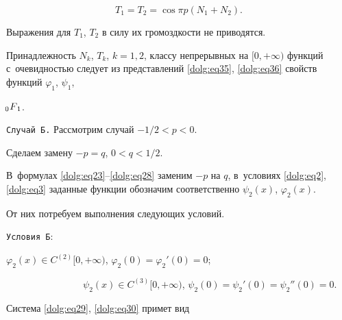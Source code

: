 \begin{equation}\label{dolg:eq38}

T_1 = T_2 = \cos\pi p (N_1+N_2).

\end{equation}

Выражения для $T_1$, $T_2$ в силу их громоздкости не приводятся.



Принадлежность $N_k$, $T_k$, $k=1, 2$, классу непрерывных на $[0,+\infty)$ функций с~очевидностью следует из представлений \eqref{dolg:eq35}, \eqref{dolg:eq36} свойств функций $\varphi_1$, $\psi_1$, 

$  \,\, F_{\hspace{-4mm}0 \hspace{3mm}1}$.



\smallskip



\texttt{Случай Б.} Рассмотрим случай $-{1}/{2}<p<0$. 

Сделаем замену $-p=q$, $0<q<{1}/{2}$. 

В~формулах \eqref{dolg:eq23}--\eqref{dolg:eq28} заменим $-p$ на $q$, в~условиях \eqref{dolg:eq2}, \eqref{dolg:eq3} заданные функции обозначим соответственно $\psi_2(x)$, $\varphi_2(x)$. 

От них потребуем выполнения следующих условий.



\smallskip



\hypertarget{d:uslB}{}



\texttt{Условия Б}:

$\varphi_2(x)\in C^{(2)}[0,+\infty)$, $\varphi_2(0)={\varphi_2}'(0)=0$; \par

{}~~~~~~~~~~~~~~~~$\psi_2(x)\in C^{(3)}[0,+\infty)$, $\psi_2(0)={\psi_2}'(0)={\psi_2}''(0)=0$.



\smallskip

 



Система \eqref{dolg:eq29}, \eqref{dolg:eq30} примет вид

